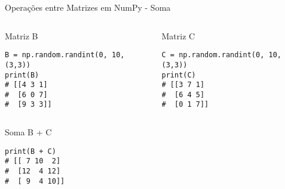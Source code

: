 \begin{frame}[fragile]{Operações entre Matrizes em NumPy - Soma}
    \begin{columns}[T]
        \begin{column}{0.5\textwidth}
            \begin{block}{Matriz B}
                \begin{verbatim}
B = np.random.randint(0, 10, (3,3))
print(B)
# [[4 3 1]
#  [6 0 7]
#  [9 3 3]]
\end{verbatim}
            \end{block}
        \end{column}

        \begin{column}{0.5\textwidth}
            \begin{block}{Matriz C}
                \begin{verbatim}
C = np.random.randint(0, 10, (3,3))
print(C)
# [[3 7 1]
#  [6 4 5]
#  [0 1 7]]
\end{verbatim}
            \end{block}
        \end{column}
    \end{columns}


    \begin{exampleblock}{Soma B + C}
        \begin{verbatim}
print(B + C)
# [[ 7 10  2]
#  [12  4 12]
#  [ 9  4 10]]
\end{verbatim}
    \end{exampleblock}






\end{frame}

